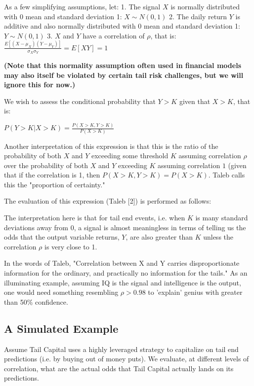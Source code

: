 \documentclass[11pt]{article}
\begin{document}
    As a few simplifying assumptions, let: 1. The signal \(X\) is normally
distributed with 0 mean and standard deviation 1: \(X \sim N(0, 1)\) 2.
The daily return \(Y\) is additive and also normally distributed with 0
mean and standard deviation 1: \(Y \sim N(0, 1)\) 3. \(X\) and \(Y\)
have a correlation of \(\rho\), that is:
\(\frac{E[(X - \mu_{X})(Y - \mu_{Y})]}{\sigma_{X} \sigma_{Y}} = E[X Y] = 1\)

    \textbf{(Note that this normality assumption often used in financial
models may also itself be violated by certain tail risk challenges, but
we will ignore this for now.)}

    We wish to assess the conditional probability that \(Y > K\) given that
\(X > K\), that is:

\(P(Y > K | X > K) = \frac{P(X > K, Y > K)}{P(X > K)}\)

Another interpretation of this expression is that this is the ratio of
the probability of both \(X\) and \(Y\) exceeding some threshold \(K\)
assuming correlation \(\rho\) over the probability of both \(X\) and
\(Y\) exceeding \(K\) assuming correlation \(1\) (given that if the
correlation is 1, then \(P(X > K, Y > K) = P(X > K)\). Taleb calls this
the "proportion of certainty."

    The evaluation of this expression (Taleb {[}2{]}) is performed as
follows:

    

    The interpretation here is that for tail end events, i.e. when \(K\) is
many standard deviations away from \(0\), a signal is almost meaningless
in terms of telling us the odds that the output variable returns, \(Y\),
are also greater than \(K\) unless the correlation \(\rho\) is very
close to 1.

In the words of Taleb, "Correlation between X and Y carries
disproportionate information for the ordinary, and practically no
information for the tails." As an illuminating example, assuming IQ is
the signal and intelligence is the output, one would need something
resembling \(\rho > 0.98\) to 'explain' genius with greater than 50\%
confidence.

    \subsection{A Simulated Example}\label{a-simulated-example}

    Assume Tail Capital uses a highly leveraged strategy to capitalize on
tail end predictions (i.e. by buying out of money puts). We evaluate, at
different levels of correlation, what are the actual odds that Tail
Capital actually lands on its predictions.
\end{document}
